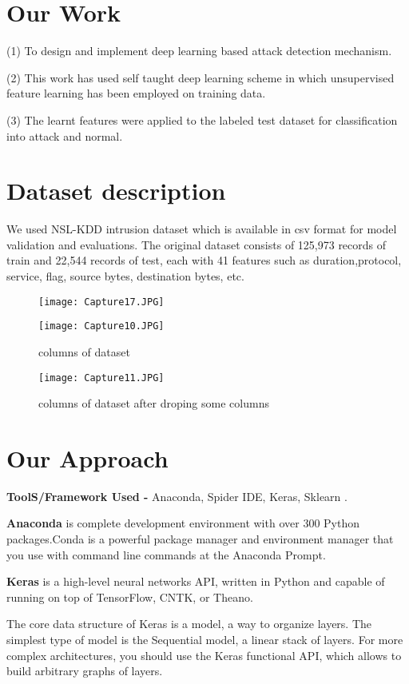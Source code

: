 \section{Our Work}
(1) To design and implement deep learning based attack detection mechanism.

(2) This work has used self taught deep learning scheme in which unsupervised feature learning has been employed on training data.

(3) The learnt features were applied to the labeled test dataset for classification into attack and normal.
\section{Dataset description}
We used NSL-KDD intrusion dataset which is available in csv format for
model validation and evaluations.
The original dataset consists of 125,973 records of train and 22,544 records of test, each with 41 features such as duration,protocol, service, flag, source bytes, destination bytes, etc.

\begin{figure}[h]
	\texttt{[image: Capture17.JPG]}
	\caption{}
	\label{fig:boat1}
\end{figure}
\newpage
\begin{figure}[t]
	\texttt{[image: Capture10.JPG]}
	\caption{columns of dataset}
	\label{}
\end{figure}
\begin{figure}[h]
	\texttt{[image: Capture11.JPG]}
	\caption{columns of dataset after droping some columns}
	\label{}
\end{figure}

\section{Our Approach}
\textbf{ToolS/Framework Used -}  Anaconda, Spider IDE, Keras, Sklearn .

\textbf{Anaconda} is complete development environment with over 300 Python packages.Conda is a powerful package manager and environment manager that you use with command line commands at the Anaconda Prompt.

\textbf{Keras} is a high-level neural networks API, written in Python and capable of running on top of TensorFlow, CNTK, or Theano.

The core data structure of Keras is a model, a way to organize layers. The simplest type of model is the Sequential model, a linear stack of layers. For more complex architectures, you should use the Keras functional API, which allows to build arbitrary graphs of layers.

